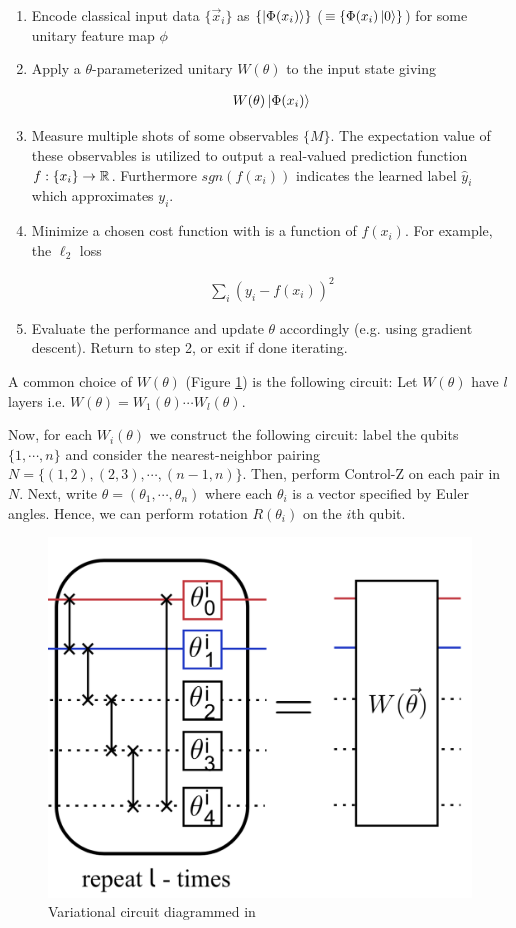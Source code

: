 \documentclass[main.tex]{subfiles}
\begin{document}
\begin{enumerate}
\item Encode classical input data $\{\vec{x}_i \}$ as $\{\ket{\Phi(x_i)} \}$ ($\equiv \{\Phi(x_i)\ket{0} \}$) for some unitary feature map $\phi$

\item Apply a $\theta$-parameterized unitary $W(\theta)$ to the input state giving

\begin{align*}
W(\theta)\ket{\Phi(x_i)}
\end{align*}

\item Measure multiple shots of some observables $\{M\}$. The expectation value of these observables is utilized to output a real-valued prediction function $f : \{x_i\} \rightarrow \mathbb{R}$. Furthermore $sgn(f(x_i))$ indicates the learned label $\hat{y}_i$ which approximates $y_i$.

\item Minimize a chosen cost function with is a function of $f(x_i)$. For example, the $\ell_2$ loss

\begin{align*}
\sum_i (y_i - f(x_i))^2	
\end{align*}

\item Evaluate the performance and update $\theta$ accordingly (e.g. using gradient descent). Return to step 2, or exit if done iterating.

\end{enumerate}

A common choice of $W(\theta)$ (Figure \ref{fig:var}) is the following circuit: Let $W(\theta)$ have $l$ layers i.e. $W(\theta) = W_1(\theta) \cdots W_l(\theta)$. 

Now, for each $W_i(\theta)$ we construct the following circuit: label the qubits $\{1, \cdots, n\}$ and consider the nearest-neighbor pairing $N = \{(1,2), (2, 3), \cdots, (n-1, n)\}$. Then, perform Control-Z on each pair in $N$. Next, write $\theta = (\theta_1, \cdots, \theta_n)$ where each $\theta_i$ is a vector specified by Euler angles. Hence, we can perform rotation $R(\theta_i)$ on the $i$th qubit.

\begin{figure}
\label{fig:var}
\centering
\includegraphics[width=0.5 \textwidth]{images/variational.png}	
\caption{Variational circuit diagrammed in \cite{havlicek2018supervised}}
\end{figure}
\end{document}
